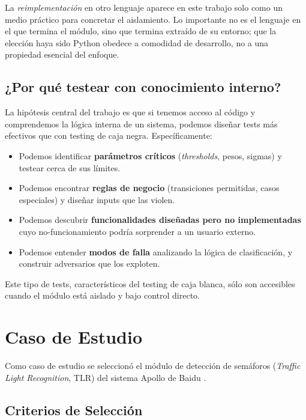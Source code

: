 La \textit{reimplementación} en otro lenguaje aparece en este trabajo solo como un medio práctico para concretar el aislamiento. Lo importante no es el lenguaje en el que termina el módulo, sino que termina extraído de su entorno; que la elección haya sido Python obedece a comodidad de desarrollo, no a una propiedad esencial del enfoque.

\subsection{¿Por qué testear con conocimiento interno?}

La hipótesis central del trabajo es que si tenemos acceso al código y comprendemos la lógica interna de un sistema, podemos diseñar tests más efectivos que con testing de caja negra. Específicamente:

\begin{itemize}
    \item Podemos identificar \textbf{parámetros críticos} (\textit{thresholds}, pesos, sigmas) y testear cerca de sus límites.
    \item Podemos encontrar \textbf{reglas de negocio} (transiciones permitidas, casos especiales) y diseñar inputs que las violen.
    \item Podemos descubrir \textbf{funcionalidades diseñadas pero no implementadas} cuyo no-funcionamiento podría sorprender a un usuario externo.
    \item Podemos entender \textbf{modos de falla} analizando la lógica de clasificación, y construir adversarios que los exploten.
\end{itemize}

Este tipo de tests, característicos del testing de caja blanca, sólo son accesibles cuando el módulo está aislado y bajo control directo.

\section{Caso de Estudio}

Como caso de estudio se seleccionó el módulo de detección de semáforos (\textit{Traffic Light Recognition}, TLR) del sistema Apollo de Baidu \cite{apollo_auto}.

\subsection{Criterios de Selección}

